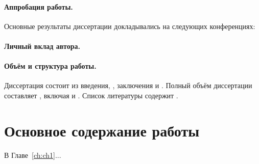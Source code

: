 \paragraph*{Аппробация работы.}
Основные результаты диссертации докладывались на следующих конференциях:
\printConferenceRU

\paragraph*{Личный вклад автора.}


\paragraph*{Объём и структура работы.}
Диссертация состоит из введения,
,
заключения и
.
%
Полный объём диссертации составляет
, включая
 и
.
Список литературы содержит
.


\newpage
\section*{Основное содержание работы}

В Главе~\ref{ch:ch1}...

